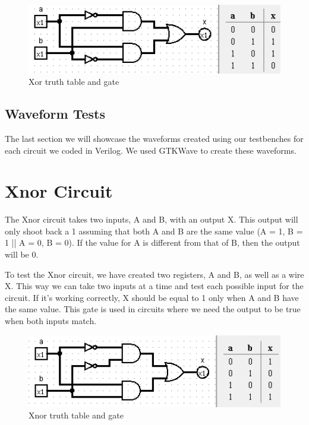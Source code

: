 \documentclass[12pt]{article}
\begin{document}
\begin{figure}[h]
    \centering
    \includegraphics[width = 1.0\textwidth]{figs/xor.png}
    \caption{Xor truth table and gate}
    \label{fig:enter-label}
\end{figure}


\subsection{Waveform Tests}

The last section we will showcase the waveforms created using our testbenches for each circuit we coded in Verilog. We used GTKWave to create these waveforms.







\section{Xnor Circuit}
The Xnor circuit takes two inputs, A and B, with an output X. This output will only shoot back a 1 assuming that both A and B are the same value (A = 1, B = 1 || A = 0, B = 0). If the value for A is different from that of B, then the output will be 0.


To test the Xnor circuit, we have created two registers, A and B, as well as a wire X. This way we can take two inputs at a time and test each possible input for the circuit. If it's working correctly, X should be equal to 1 only when A and B have the same value. This gate is used in circuits where we need the output to be true when both inputs match.


\begin{figure}[h]
    \centering
    \includegraphics[width = 1.0\textwidth]{figs/xnorgate.png}
    \caption{Xnor truth table and gate}
    \label{fig:enter-label}
\end{figure}
\end{document}
